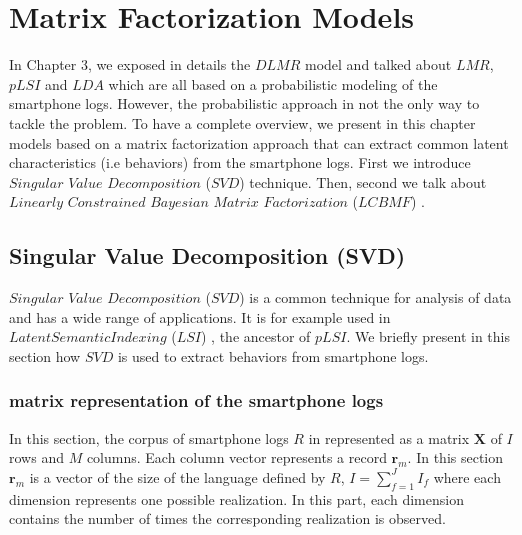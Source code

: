 
\chapter{Matrix Factorization Models} %

\label{Matrix Factorization Models} %


In Chapter 3, we exposed in details the $DLMR$ model and talked about $LMR$, $pLSI$ and $LDA$ which are all based on a probabilistic modeling of the smartphone logs. However, the probabilistic approach in not the only way to tackle the problem. To have a complete overview, we present in this chapter models based on a matrix factorization approach that can extract common latent characteristics (i.e behaviors) from the smartphone logs. First we introduce $Singular$ $Value$ $Decomposition$ ($SVD$) \cite{svd} technique. Then, second we talk about $Linearly$ $Constrained$ $Bayesian$ $Matrix$ $Factorization$ ($LCBMF$) \cite{lcbmf}.

\section{Singular Value Decomposition (SVD)}

$Singular$ $Value$ $Decomposition$ ($SVD$) \cite{svd} is a common technique for analysis of data and has a wide range of applications. It is for example used in $Latent Semantic Indexing$ ($LSI$) \cite{lsi}, the ancestor of $pLSI$. We briefly present in this section how $SVD$ is used to extract behaviors from smartphone logs.


\subsection{matrix representation of the smartphone logs} \label{4.1.1}

In this section, the corpus of smartphone logs $R$ in represented as a matrix $\boldsymbol{X}$ of $I$ rows and $M$ columns. Each column vector represents a record $\mathbf{r}_{m}$. In this section $\mathbf{r}_{m}$ is a vector of the size of the language defined by $R$, $I=\sum_{f=1}^{J}I_{f}$ where each dimension represents one possible realization.  In this part, each dimension contains the number of times the corresponding realization is observed. \par

